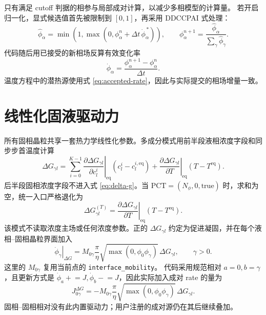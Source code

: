 \documentclass[UTF8,a4paper,11pt]{ctexart}
\begin{document}
只有满足 cutoff 判据的相参与局部成对计算，以减少多相模型的计算量。
若开启归一化，显式候选值首先被限制到 \([0,1]\)，再采用 DDCCPAI 式处理：
\begin{equation}
 \widehat\phi_\alpha
 =\min\!\left(1,\max\!\left(0,\phi_\alpha^n
 +\Delta t\,\dot\phi_\alpha^{\,*}\right)\right),\qquad
 \phi_\alpha^{n+1}
 =\frac{\widehat\phi_\alpha}{\sum_\gamma\widehat\phi_\gamma}.
\end{equation}
代码随后用已接受的新相场反算有效变化率
\begin{equation}
 \dot\phi_\alpha
 =\frac{\phi_\alpha^{n+1}-\phi_\alpha^n}{\Delta t}.
\label{eq:accepted-rate}
\end{equation}
温度方程中的潜热源使用式 \eqref{eq:accepted-rate}，因此与实际提交的相场增量一致。

\section{线性化固液驱动力}

所有固相晶粒共享一套热力学线性化参数。多成分模式用前半段液相浓度字段和同步步首温度计算
\begin{equation}
 \Delta G_{\gamma l}
 =
 \sum_{i=0}^{K-1}
 \left.\frac{\partial\Delta G_{\gamma l}}{\partial c_l^i}\right|_{\mathrm{eq}}
 (c_l^i-c_l^{i,\mathrm{eq}})
 +
 \left.\frac{\partial\Delta G_{\gamma l}}{\partial T}\right|_{\mathrm{eq}}
 (T-T^{\mathrm{eq}}).
\label{eq:delta-g}
\end{equation}
后半段固相浓度字段不进入式 \eqref{eq:delta-g}。当
\(\mathrm{PCT}=(N_\phi,0,\mathrm{true})\) 时，求和为空，统一入口严格退化为
\begin{equation}
 \Delta G_{\gamma l}^{(T)}
 =
 \left.\frac{\partial\Delta G_{\gamma l}}{\partial T}\right|_{\mathrm{eq}}
 (T-T^{\mathrm{eq}}).
 \label{eq:delta-g-thermal}
\end{equation}
该模式不读取浓度主场或任何浓度参数。正的 \(\Delta G_{\gamma l}\)
约定为促进凝固，并在每个液相--固相晶粒界面加入
\begin{equation}
 \left.\dot\phi_\gamma\right|_{\Delta G}
 =M_{0\gamma}\frac{\pi}{\eta}
 \sqrt{\max(0,\phi_0\phi_\gamma)}\,\Delta G_{\gamma l},
 \qquad \gamma>0 .
\end{equation}
这里的 \(M_{0\gamma}\) 复用当前点的 \texttt{interface\_mobility}。
代码采用规范相对 \(a=0,b=\gamma\)，且更新方式是
\(\dot\phi_a\mathrel{+}=J,\dot\phi_b\mathrel{-}=J\)，因此实际加入成对 rate 的量为
\begin{equation}
 J_{0\gamma}^{\Delta G}
 =-M_{0\gamma}\frac{\pi}{\eta}
 \sqrt{\max(0,\phi_0\phi_\gamma)}\,\Delta G_{\gamma l}.
\end{equation}
固相--固相相对没有此内置驱动力；用户注册的成对源仍在其后继续叠加。
\end{document}
